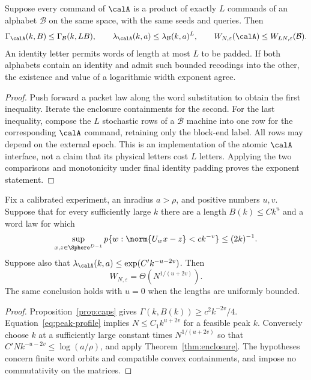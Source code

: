 \begin{proposition}\label{prop:recoding}
Suppose every command of $\calA$ is a product of exactly $L$ commands of an alphabet $\mathcal B$ on the same space, with the same seeds and queries. Then
\[
 \Gamma_{\calA}(k,B)\le\Gamma_{\mathcal B}(k,LB),\qquad
 \lambda_{\calA}(k,a)\le\lambda_{\mathcal B}(k,a)^L,
 \qquad W_{N,\varepsilon}(\calA)\le W_{LN,\varepsilon}(\mathcal B).
\]
An identity letter permits words of length at most $L$ to be padded. If both alphabets contain an identity and admit such bounded recodings into the other, the existence and value of a logarithmic width exponent agree.
\end{proposition}
\begin{proof}
Push forward a packet law along the word substitution to obtain the first inequality. Iterate the enclosure containments for the second. For the last inequality, compose the $L$ stochastic rows of a $\mathcal B$ machine into one row for the corresponding $\calA$ command, retaining only the block-end label. All rows may depend on the external epoch. This is an implementation of the atomic $\calA$ interface, not a claim that its physical letters cost $L$ letters. Applying the two comparisons and monotonicity under final identity padding proves the exponent statement.
\end{proof}

\begin{corollary}\label{cor:balance}
Fix a calibrated experiment, an inradius $a>\rho$, and positive numbers $u,v$. Suppose that for every sufficiently large $k$ there are a length $B(k)\le Ck^u$ and a word law for which
\[
 \sup_{x,z\in\Sphere^{D-1}}p\{w:\norm{U_wx-z}<c k^{-v}\}\le(2k)^{-1}.
\]
Suppose also that $\lambda_{\calA}(k,a)\le\exp(C'k^{-u-2v})$. Then
\[
                         W_{N,\varepsilon}=\Theta(N^{1/(u+2v)}).
\]
The same conclusion holds with $u=0$ when the lengths are uniformly bounded.
\end{corollary}
\begin{proof}
Proposition~\ref{prop:caps} gives $\Gamma(k,B(k))\ge c^2k^{-2v}/4$. Equation~\eqref{eq:peak-profile} implies $N\le C_1k^{u+2v}$ for a feasible peak $k$. Conversely choose $k$ at a sufficiently large constant times $N^{1/(u+2v)}$ so that $C'Nk^{-u-2v}\le\log(a/\rho)$, and apply Theorem~\ref{thm:enclosure}. The hypotheses concern finite word orbits and compatible convex containments, and impose no commutativity on the matrices.
\end{proof}
